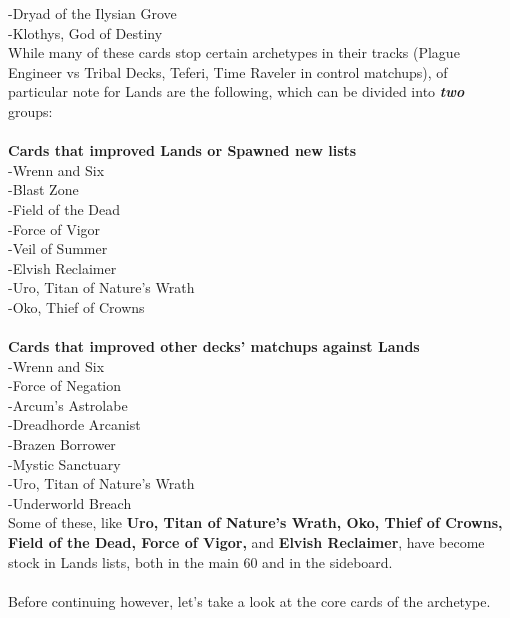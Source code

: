 \documentclass{report}
\begin{document}
-Dryad of the Ilysian Grove\\
-Klothys, God of Destiny\\
While many of these cards stop certain archetypes in their tracks (Plague Engineer vs Tribal Decks, Teferi, Time Raveler in control matchups), of particular note for Lands are the following, which can be divided into \textbf\emph{{two}} groups:\\\\
\newpage
\textbf{Cards that improved Lands or Spawned new lists\\}
-Wrenn and Six\\
-Blast Zone\\
-Field of the Dead\\
-Force of Vigor\\
-Veil of Summer\\
-Elvish Reclaimer\\
-Uro, Titan of Nature's Wrath\\
-Oko, Thief of Crowns\\\\
\textbf{Cards that improved other decks' matchups against Lands\\}
-Wrenn and Six\\
-Force of Negation\\
-Arcum's Astrolabe\\
-Dreadhorde Arcanist\\
-Brazen Borrower\\
-Mystic Sanctuary\\
-Uro, Titan of Nature's Wrath\\
-Underworld Breach\\
Some of these, like \textbf{Uro, Titan of Nature's Wrath, Oko, Thief of Crowns, Field of the Dead, Force of Vigor,} and \textbf{Elvish Reclaimer}, have become stock in Lands lists, both in the main 60 and in the sideboard.\\\\Before continuing however, let's take a look at the core cards of the archetype.\\
\newpage
\end{document}
